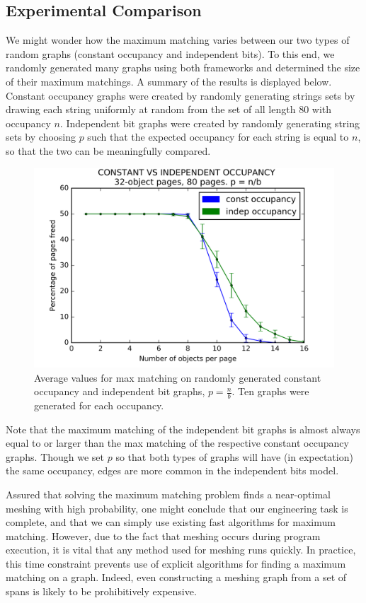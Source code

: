 \subsection{Experimental Comparison}
We might wonder how the maximum matching varies between our two types of random graphs (constant occupancy and independent bits).  To this end, we randomly generated many graphs using both frameworks and determined the size of their maximum matchings.  A summary of the results is displayed below.  Constant occupancy graphs were created by randomly generating strings sets by drawing each string uniformly at random from the set of all length 80 with occupancy $n$.  Independent bit graphs were created by randomly generating string sets by choosing $p$ such that the expected occupancy for each string is equal to $n$, so that the two can be meaningfully compared.


\begin{figure}[h]
\includegraphics[scale = .5]{figures/constvindep_32,80.png}
\centering
\caption{Average values for max matching on randomly generated constant occupancy and independent bit graphs, $p = \frac{n}{b}$.  Ten graphs were generated for each occupancy.}
\end{figure}

Note that the maximum matching of the independent bit graphs is almost always equal to or larger than the max matching of the respective constant occupancy graphs.  Though we set $p$ so that both types of graphs will have (in expectation) the same occupancy, edges are more common in the independent bits model.
\fi

\iffalse
Assured that solving the maximum matching problem finds a near-optimal meshing with high probability, one might conclude that our engineering task is complete, and that we can simply use existing fast algorithms for maximum matching.  However, due to the fact that meshing occurs during program execution, it is vital that any method used for meshing runs quickly.  In practice, this time constraint prevents use of explicit algorithms for finding a maximum matching on a graph.  Indeed, even constructing a meshing graph from a set of spans is likely to be prohibitively expensive.

